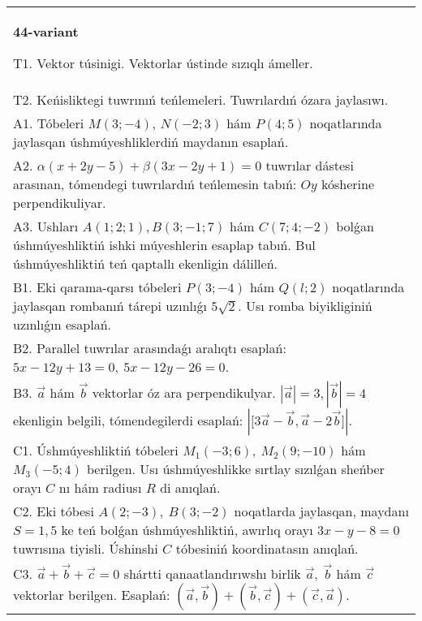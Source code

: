 \documentclass{article}
\begin{document}
\begin{tabular}{m{17cm}}
\textbf{44-variant}
\newline

T1. 
Vektor túsinigi. Vektorlar ústinde sızıqlı ámeller.
 \\
T2. 
Keńisliktegi tuwrınıń teńlemeleri. Tuwrılardıń ózara jaylasıwı.
 \\
A1. 
Tóbeleri $M(3;-4)$, $N(-2;3)$ hám $P(4;5)$ 
noqatlarında jaylasqan úshmúyeshliklerdiń maydanın esaplań.
 \\
A2. 
$\alpha(x+2y-5)+\beta(3x-2y+1)=0$ tuwrılar
dástesi arasınan, tómendegi tuwrılardıń teńlemesin tabıń:
$Oy$ kósherine perpendikuliyar. \\
A3. 
Ushları $A (1;2;1), B (3;-1;7)$ hám $C(7;4;-2)$ bolǵan úshmúyeshliktiń
ishki múyeshlerin esaplap tabıń. Bul úshmúyeshliktiń teń qaptallı ekenligin dálilleń. 
 \\
B1. 
Eki qarama-qarsı tóbeleri $P(3; -4)$ hám $Q(l;2)$ noqatlarında jaylasqan rombanıń tárepi uzınlıǵı \(5\sqrt{2}\). Usı romba biyikliginiń uzınlıǵın esaplań.
 \\
B2. 
Parallel tuwrılar arasındaǵı aralıqtı esaplań: $5x-12y+13=0,\ 5x-12y-26=0$.
 \\
B3. 
$\vec{a}$ hám $\vec{b}$ vektorlar óz ara perpendikulyar. $|\vec{a}| = 3,|\vec{b}| = 4$ ekenligin belgili, tómendegilerdi esaplań: 
$|\lbrack 3\vec{a} - \vec{b},\vec{a}-2\vec{b}\rbrack|$.
 \\
C1. 
Úshmúyeshliktiń tóbeleri \(M_{1}( - 3;6),\ M_{2}(9; - 10)\) 
hám \(M_{3}( - 5;4)\) berilgen. Usı úshmúyeshlikke sırtlay sızılǵan
sheńber orayı $C$ nı hám radiusı $R$ di anıqlań.
 \\
C2. 
Eki tóbesi \(A(2; - 3),\ B(3; - 2)\) noqatlarda
jaylasqan, maydanı \(S = 1,5\) ke teń bolǵan úshmúyeshliktiń,
awırlıq orayı \(3x - y - 8 = 0\) tuwrısına tiyisli. Úshinshi $C$
tóbesiniń koordinatasın anıqlań.
 \\
C3. \(\vec{a} + \vec{b} + \vec{c} = 0\) shártti qanaatlandırıwshı birlik \(\vec{a},\ \vec{b}\) hám \(\vec{c}\) vektorlar berilgen. Esaplań: \(\left(\vec{a},\vec{b} \right) + \left(\vec{b},\vec{c} \right) + \left(\vec{c},\vec{a} \right) \).
 \\

\end{tabular}
\vspace{1cm}
\end{document}
